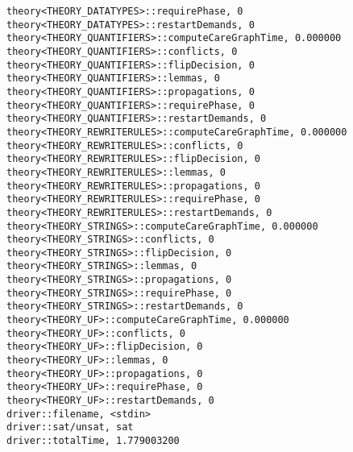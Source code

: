 \begin{lstlisting}
theory<THEORY_DATATYPES>::requirePhase, 0
theory<THEORY_DATATYPES>::restartDemands, 0
theory<THEORY_QUANTIFIERS>::computeCareGraphTime, 0.000000
theory<THEORY_QUANTIFIERS>::conflicts, 0
theory<THEORY_QUANTIFIERS>::flipDecision, 0
theory<THEORY_QUANTIFIERS>::lemmas, 0
theory<THEORY_QUANTIFIERS>::propagations, 0
theory<THEORY_QUANTIFIERS>::requirePhase, 0
theory<THEORY_QUANTIFIERS>::restartDemands, 0
theory<THEORY_REWRITERULES>::computeCareGraphTime, 0.000000
theory<THEORY_REWRITERULES>::conflicts, 0
theory<THEORY_REWRITERULES>::flipDecision, 0
theory<THEORY_REWRITERULES>::lemmas, 0
theory<THEORY_REWRITERULES>::propagations, 0
theory<THEORY_REWRITERULES>::requirePhase, 0
theory<THEORY_REWRITERULES>::restartDemands, 0
theory<THEORY_STRINGS>::computeCareGraphTime, 0.000000
theory<THEORY_STRINGS>::conflicts, 0
theory<THEORY_STRINGS>::flipDecision, 0
theory<THEORY_STRINGS>::lemmas, 0
theory<THEORY_STRINGS>::propagations, 0
theory<THEORY_STRINGS>::requirePhase, 0
theory<THEORY_STRINGS>::restartDemands, 0
theory<THEORY_UF>::computeCareGraphTime, 0.000000
theory<THEORY_UF>::conflicts, 0
theory<THEORY_UF>::flipDecision, 0
theory<THEORY_UF>::lemmas, 0
theory<THEORY_UF>::propagations, 0
theory<THEORY_UF>::requirePhase, 0
theory<THEORY_UF>::restartDemands, 0
driver::filename, <stdin>
driver::sat/unsat, sat
driver::totalTime, 1.779003200
\end{lstlisting}